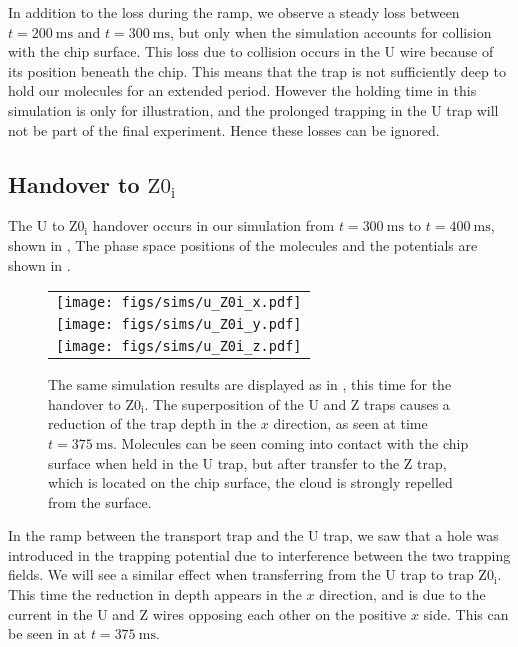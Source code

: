 In addition to the loss during the ramp, we observe a steady loss between
$t=\SI{200}{\milli\second}$ and $t=\SI{300}{\milli\second}$, but only when the
simulation accounts for collision with the chip surface. This loss due to
collision occurs in the U wire because of its position beneath the chip. This
means that the trap is not sufficiently deep to hold our molecules for an
extended period. However the holding time in this simulation is only for
illustration, and the prolonged trapping in the U trap will not be part of the
final experiment. Hence these losses can be ignored.

\subsection{Handover to $\mathrm{Z0_i}$}
\label{design:sim:U_to_Z0i}


The U to $\mathrm{Z0_i}$ handover occurs in our simulation from
$t=\SI{300}{\milli\second}$ to $t=\SI{400}{\milli\second}$, shown in
, 
The phase space positions of the molecules and the potentials are shown in
.

\begin{figure}[p]
\centering
  \begin{tabular}{c}
    \texttt{[image: figs/sims/u\_Z0i\_x.pdf]} \\
    \texttt{[image: figs/sims/u\_Z0i\_y.pdf]} \\
    \texttt{[image: figs/sims/u\_Z0i\_z.pdf]}
  \end{tabular}
  \caption{
    The same simulation results are displayed as in
    , this time for the handover to $\mathrm{Z0_i}$.
    The superposition of the U and Z traps causes a reduction of the trap depth
    in the $x$ direction, as seen at time $t=\SI{375}{\milli\second}$.
    Molecules can be seen coming into contact with the chip surface when held
    in the U trap, but after transfer to the Z trap, which is located on the
    chip surface, the cloud is strongly repelled from the surface.
  }
  \label{design:fig:U_Z0i}
\end{figure}

In the ramp between the transport trap and the U trap, we saw that a hole was
introduced in the trapping potential due to interference between the two
trapping fields. We will see a similar effect when transferring from the U trap
to trap $\mathrm{Z0_i}$.  This time the reduction in depth appears in the $x$
direction, and is due to the current in the U and Z wires opposing each other
on the positive $x$ side. This can be seen in  at
$t=\SI{375}{\milli\second}$.

